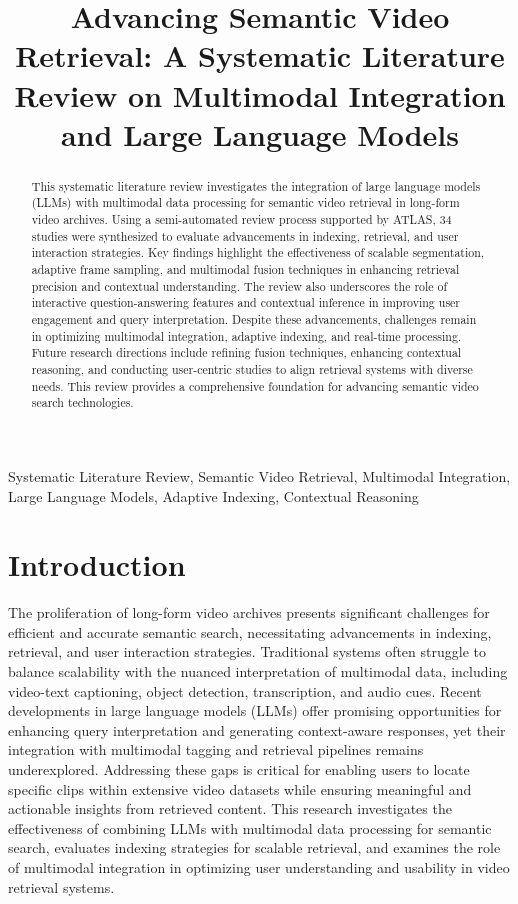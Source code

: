 \documentclass[conference]{IEEEtran}
\title{Advancing Semantic Video Retrieval: A Systematic Literature Review on Multimodal Integration and Large Language Models}
\author{\IEEEauthorblockN{ATLAS Generated Draft}}
\begin{document}
\maketitle

\begin{abstract}
This systematic literature review investigates the integration of large language models (LLMs) with multimodal data processing for semantic video retrieval in long-form video archives. Using a semi-automated review process supported by ATLAS, 34 studies were synthesized to evaluate advancements in indexing, retrieval, and user interaction strategies. Key findings highlight the effectiveness of scalable segmentation, adaptive frame sampling, and multimodal fusion techniques in enhancing retrieval precision and contextual understanding. The review also underscores the role of interactive question-answering features and contextual inference in improving user engagement and query interpretation. Despite these advancements, challenges remain in optimizing multimodal integration, adaptive indexing, and real-time processing. Future research directions include refining fusion techniques, enhancing contextual reasoning, and conducting user-centric studies to align retrieval systems with diverse needs. This review provides a comprehensive foundation for advancing semantic video search technologies.
\end{abstract}

\begin{IEEEkeywords}
Systematic Literature Review, Semantic Video Retrieval, Multimodal Integration, Large Language Models, Adaptive Indexing, Contextual Reasoning
\end{IEEEkeywords}

\section{Introduction}
The proliferation of long-form video archives presents significant challenges for efficient and accurate semantic search, necessitating advancements in indexing, retrieval, and user interaction strategies. Traditional systems often struggle to balance scalability with the nuanced interpretation of multimodal data, including video-text captioning, object detection, transcription, and audio cues. Recent developments in large language models (LLMs) offer promising opportunities for enhancing query interpretation and generating context-aware responses, yet their integration with multimodal tagging and retrieval pipelines remains underexplored. Addressing these gaps is critical for enabling users to locate specific clips within extensive video datasets while ensuring meaningful and actionable insights from retrieved content. This research investigates the effectiveness of combining LLMs with multimodal data processing for semantic search, evaluates indexing strategies for scalable retrieval, and examines the role of multimodal integration in optimizing user understanding and usability in video retrieval systems.
\end{document}

